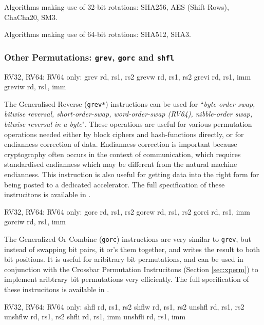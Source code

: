 Algorithms making use of 32-bit rotations:
SHA256, AES (Shift Rows), ChaCha20, SM3.

Algorithms making use of 64-bit rotations:
SHA512, SHA3.

\subsubsection{Other Permutations: {\tt grev}, {\tt gorc} and {\tt shfl}}
\label{sec:scalar:bitmanip:grev}

\begin{cryptobitmanipisa}
RV32, RV64:                         RV64 only:
    grev rd, rs1, rs2                   grevw rd, rs1, rs2
    grevi rd, rs1, imm                  greviw rd, rs1, imm
\end{cryptobitmanipisa}

The Generalised Reverse ({\tt grev*}) instructions can be used for 
``{\em byte-order swap, bitwise reversal, short-order-swap,
word-order-swap (RV64), nibble-order swap, bitwise reversal in a byte}".
These operations are useful for various permutation operations
needed either by block ciphers and hash-functions directly, or for
endianness correction of data.
Endianness correction is important because
cryptography often occurs in the context of communication, which requires
standardised endianness which may be different from the natural machine
endianness.
This instruction is also useful for getting data into the right form
for being posted to a dedicated accelerator.
The full specification of these instrucitons is available in
\cite[Section 2.2.2]{riscv:bitmanip:draft}.

\begin{cryptobitmanipisa}
RV32, RV64:                         RV64 only:
    gorc    rd, rs1, rs2                gorcw   rd, rs1, rs2
    gorci   rd, rs1, imm                gorciw  rd, rs1, imm
\end{cryptobitmanipisa}

The Generalized Or Combine ({\tt gorc}) instructions are very similar
to {\tt grev}, but instead of swapping bit pairs, it or's them together,
and writes the result to both bit positions.
It is useful for aribitrary bit permutations, and can be used in
conjunction with the Crossbar Permutation Instrucitons
(Section \ref{sec:xperm}) to implement aribtrary bit permutations
very efficiently.
The full specification of these instrucitons is available in
\cite[Section 2.3]{riscv:bitmanip:draft}.

\begin{cryptobitmanipisa}
RV32, RV64:                         RV64 only:
    shfl    rd, rs1, rs2                shflw   rd, rs1, rs2
    unshfl  rd, rs1, rs2                unshflw rd, rs1, rs2
    shfli   rd, rs1, imm
    unshfli rd, rs1, imm
\end{cryptobitmanipisa}

